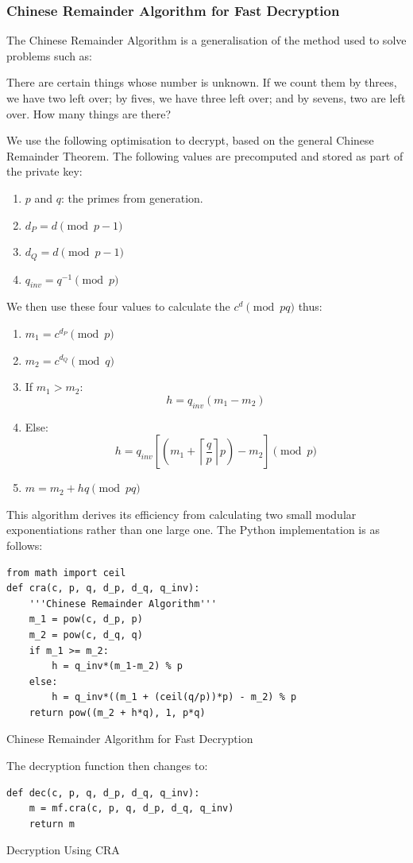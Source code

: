 \documentclass{article}
\newenvironment{longlisting}{\captionsetup{type=listing}}{}
\begin{document}
\subsubsection{Chinese Remainder Algorithm for Fast Decryption}
The Chinese Remainder Algorithm is a generalisation of the method used to solve problems such as:
\begin{displayquote}
There are certain things whose number is unknown. If we count them by threes, we have two left over;
by fives, we have three left over; and by sevens, two are left over. How many things are there?
\end{displayquote}
We use the following optimisation to decrypt, based on the general Chinese Remainder Theorem. The
following values are precomputed and stored as part of the private key:
\begin{enumerate}
\item $p$ and $q$: the primes from generation.
\item $d_P = d \pmod{p-1}$
\item $d_Q = d \pmod{p-1}$
\item $q_{inv} = q^{-1} \pmod{p}$
\end{enumerate}

We then use these four values to calculate the $c^d \pmod{pq}$ thus:
\begin{enumerate}
\item $m_1 = c^{d_P} \pmod{p}$
\item $m_2 = c^{d_Q} \pmod{q}$
\item If $m_1 > m_2$: $$h = q_{inv}(m_1 - m_2)$$
\item Else: $$h = q_{inv}[(m_1 + \left \lceil{\frac{q}{p}}\right \rceil p) - m_2] \pmod{p}$$
\item $m = m_2 + hq \pmod{pq}$
\end{enumerate}

This algorithm derives its efficiency from calculating two small modular exponentiations rather than
one large one. The Python implementation is as follows:
\begin{longlisting}
\begin{verbatim}
from math import ceil
def cra(c, p, q, d_p, d_q, q_inv):
    '''Chinese Remainder Algorithm'''
    m_1 = pow(c, d_p, p)
    m_2 = pow(c, d_q, q)
    if m_1 >= m_2:
        h = q_inv*(m_1-m_2) % p
    else:
        h = q_inv*((m_1 + (ceil(q/p))*p) - m_2) % p
    return pow((m_2 + h*q), 1, p*q)
\end{verbatim}
\caption{Chinese Remainder Algorithm for Fast Decryption}
\end{longlisting}
The decryption function then changes to:
\begin{longlisting}
\begin{verbatim}
def dec(c, p, q, d_p, d_q, q_inv):
    m = mf.cra(c, p, q, d_p, d_q, q_inv)
    return m
\end{verbatim}
\caption{Decryption Using CRA}
\end{longlisting}
\end{document}
